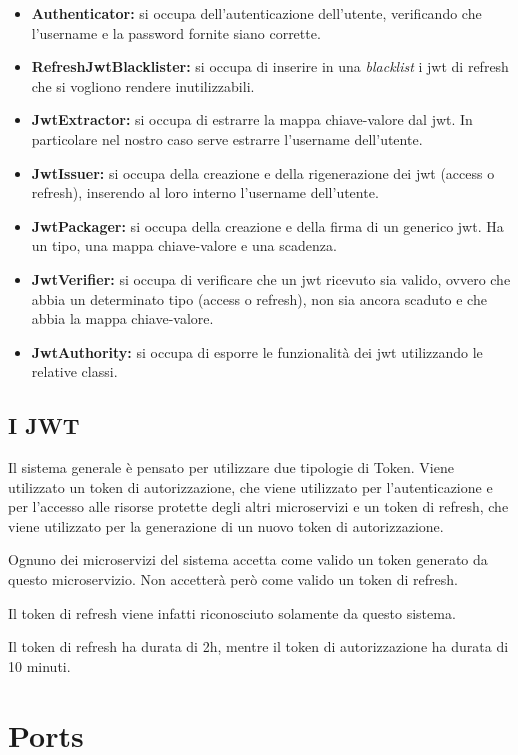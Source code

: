 \begin{itemize}
    \item \textbf{Authenticator:} si occupa dell'autenticazione dell'utente, verificando che l'username e la password fornite siano corrette.
    \item \textbf{RefreshJwtBlacklister:} si occupa di inserire in una \textit{blacklist} i jwt di refresh che si vogliono rendere inutilizzabili.
    \item \textbf{JwtExtractor:} si occupa di estrarre la mappa chiave-valore dal jwt. In particolare nel nostro caso serve estrarre l'username dell'utente.
    \item \textbf{JwtIssuer:} si occupa della creazione e della rigenerazione dei jwt (access o refresh), inserendo al loro interno l'username dell'utente.
    \item \textbf{JwtPackager:} si occupa della creazione e della firma di un generico jwt. Ha un tipo, una mappa chiave-valore e una scadenza.
    \item \textbf{JwtVerifier:} si occupa di verificare che un jwt ricevuto sia valido, ovvero che abbia un determinato tipo (access o refresh), non sia ancora scaduto e che abbia la mappa chiave-valore.
    \item \textbf{JwtAuthority:} si occupa di esporre le funzionalità dei jwt utilizzando le relative classi.
\end{itemize}

\subsection{I JWT}

Il sistema generale è pensato per utilizzare due tipologie di Token. Viene utilizzato un token di autorizzazione, che viene utilizzato per l'autenticazione e per l'accesso alle risorse protette degli altri microservizi e un token di refresh, che viene utilizzato per la generazione di un nuovo token di autorizzazione.

Ognuno dei microservizi del sistema accetta come valido un token generato da questo microservizio. Non accetterà però come valido un token di refresh.

Il token di refresh viene infatti riconosciuto solamente da questo sistema.

Il token di refresh ha durata di 2h, mentre il token di autorizzazione ha durata di 10 minuti.


\section{Ports}

